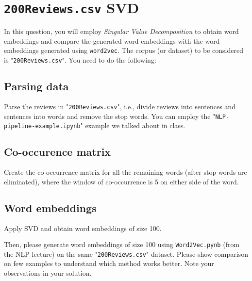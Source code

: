 \documentclass[12pt, letterpaper]{article}
\begin{document}
\section{\texttt{200Reviews.csv} SVD}

In this question, you will employ \textit{Singular Value Decomposition} to obtain word embeddings and compare the generated word embeddings with the word embeddings generated using \texttt{word2vec}. 
The corpus (or dataset) to be considered is "\texttt{200Reviews.csv}". You need to do the following: 

\subsection{Parsing data}
Parse the reviews in "\texttt{200Reviews.csv}", i.e., divide reviews into sentences and sentences into words and remove the stop words. You can employ the "\texttt{NLP-pipeline-example.ipynb}" example we talked about in class.

\subsection{Co-occurence matrix}
Create the co-occurrence matrix for all the remaining words (after stop words are eliminated), where the window of co-occurrence is 5 on either side of the word. 

\subsection{Word embeddings}
Apply SVD and obtain word embeddings of size 100.  

Then, please generate word embeddings of size 100 using \texttt{Word2Vec.pynb} (from the NLP lecture) on the same "\texttt{200Reviews.csv}" dataset. 
Please show comparison on few examples to understand which method works better. 
Note your observations in your solution.
\end{document}
